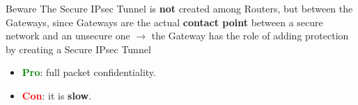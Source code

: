 \begin{center}
\vspace{-0.4cm}
\begin{quotebox-red}{Beware}
    The Secure IPsec Tunnel is \textbf{not} created among Routers, but between the Gateways,
    since Gateways are the actual \textbf{contact point} between a secure network and an unsecure one
    \(\rightarrow \) the Gateway has the role of adding protection by creating a Secure IPsec Tunnel
\end{quotebox-red}
\end{center}
\begin{itemize}
    \item \textcolor{green}{\textbf{Pro}}: full packet confidentiality.
    \item \textcolor{red}{\textbf{Con}}: it is \textbf{slow}.
\end{itemize}
\newpage
